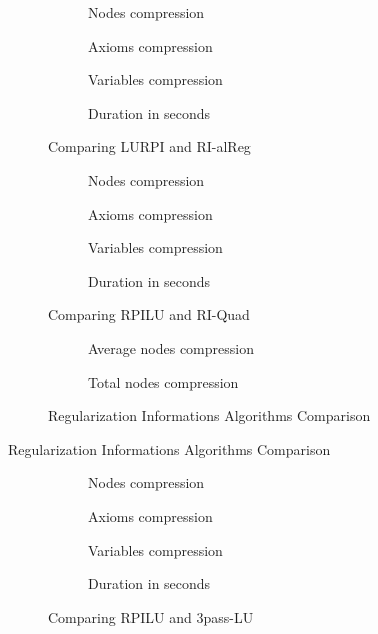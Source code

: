 \begin{figure}[hbt]
  \begin{subfigure}{0.5\textwidth}
    \centering
    \caption{Nodes compression}
  \end{subfigure}
  \begin{subfigure}{0.5\textwidth}
    \centering
    \caption{Axioms compression}
  \end{subfigure}
  \begin{subfigure}{0.5\textwidth}
    \centering
    \caption{Variables compression}
  \end{subfigure}
  \begin{subfigure}{0.5\textwidth}
    \centering
    \caption{Duration in seconds}
  \end{subfigure}
  \caption{Comparing LURPI and RI-alReg}
\end{figure}
\begin{figure}[hbt]
  \begin{subfigure}{0.5\textwidth}
    \centering
    \caption{Nodes compression}
  \end{subfigure}
  \begin{subfigure}{0.5\textwidth}
    \centering
    \caption{Axioms compression}
  \end{subfigure}
  \begin{subfigure}{0.5\textwidth}
    \centering
    \caption{Variables compression}
  \end{subfigure}
  \begin{subfigure}{0.5\textwidth}
    \centering
    \caption{Duration in seconds}
  \end{subfigure}
  \caption{Comparing RPILU and RI-Quad}
\end{figure}
\begin{figure}[hbt]
  \begin{subfigure}{0.5\textwidth}
    \centering
    \caption{Average nodes compression}
  \end{subfigure}
  \begin{subfigure}{0.5\textwidth}
    \centering
    \caption{Total nodes compression}
  \end{subfigure}
  \caption{Regularization Informations Algorithms Comparison}
\end{figure}
\begin{table}[hbt]
  \centering
  \caption{Regularization Informations Algorithms Comparison}
\end{table}
\begin{figure}[hbt]
  \begin{subfigure}{0.5\textwidth}
    \centering
    \caption{Nodes compression}
  \end{subfigure}
  \begin{subfigure}{0.5\textwidth}
    \centering
    \caption{Axioms compression}
  \end{subfigure}
  \begin{subfigure}{0.5\textwidth}
    \centering
    \caption{Variables compression}
  \end{subfigure}
  \begin{subfigure}{0.5\textwidth}
    \centering
    \caption{Duration in seconds}
  \end{subfigure}
  \caption{Comparing RPILU and 3pass-LU}
\end{figure}
